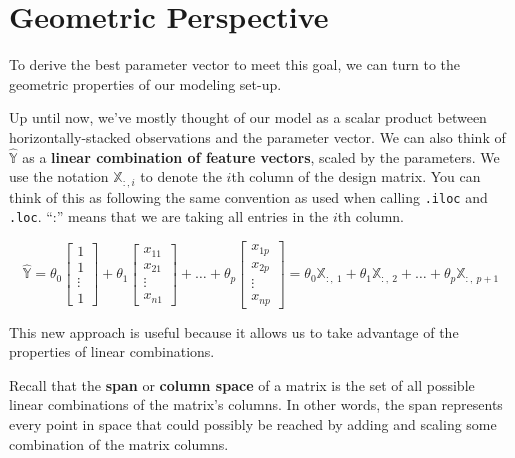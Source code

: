 \documentclass[
  letterpaper,
  DIV=11,
  numbers=noendperiod]{scrreprt}
\begin{document}
\hypertarget{geometric-perspective}{%
\section{Geometric Perspective}\label{geometric-perspective}}

To derive the best parameter vector to meet this goal, we can turn to
the geometric properties of our modeling set-up.

Up until now, we've mostly thought of our model as a scalar product
between horizontally-stacked observations and the parameter vector. We
can also think of \(\hat{\mathbb{Y}}\) as a \textbf{linear combination
of feature vectors}, scaled by the parameters. We use the notation
\(\mathbb{X}_{:, i}\) to denote the \(i\)th column of the design matrix.
You can think of this as following the same convention as used when
calling \texttt{.iloc} and \texttt{.loc}. ``:'' means that we are taking
all entries in the \(i\)th column.

\[
\hat{\mathbb{Y}} = 
\theta_0 \begin{bmatrix}
           1 \\
           1 \\
           \vdots \\
           1
         \end{bmatrix} + \theta_1 \begin{bmatrix}
           x_{11} \\
           x_{21} \\
           \vdots \\
           x_{n1}
         \end{bmatrix} + \ldots + \theta_p \begin{bmatrix}
           x_{1p} \\
           x_{2p} \\
           \vdots \\
           x_{np}
         \end{bmatrix}
         = \theta_0 \mathbb{X}_{:,\:1} + \theta_1 \mathbb{X}_{:,\:2} + \ldots + \theta_p \mathbb{X}_{:,\:p+1}\]

This new approach is useful because it allows us to take advantage of
the properties of linear combinations.

Recall that the \textbf{span} or \textbf{column space} of a matrix is
the set of all possible linear combinations of the matrix's columns. In
other words, the span represents every point in space that could
possibly be reached by adding and scaling some combination of the matrix
columns.
\end{document}
